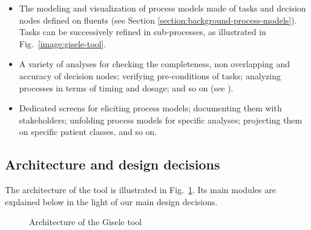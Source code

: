 \begin{itemize}
\item The modeling and visualization of process models made of tasks and decision nodes defined on fluents (see Section \ref{section:background-process-models}). Tasks can be successively refined in sub-processes, as illustrated in Fig.~\ref{image:gisele-tool}.
\item A variety of analyses for checking the completeness, non overlapping and accuracy of decision nodes; verifying pre-conditions of tasks; analyzing processes in terms of timing and dosage; and so on (see \cite{Damas:2011}).
\item Dedicated screens for eliciting process models; documenting them with stakeholders; unfolding process models for specific analyses; projecting them on specific patient classes, and so on.
\end{itemize}

\subsection*{Architecture and design decisions}

The architecture of the tool is illustrated in Fig.~\ref{image:gisele-tool-architecture}. Its main modules are explained below in the light of our main design decisions.

\begin{figure}[H]
\centering{}
  \caption{Architecture of the Gisele tool\label{image:gisele-tool-architecture}}
\end{figure}

